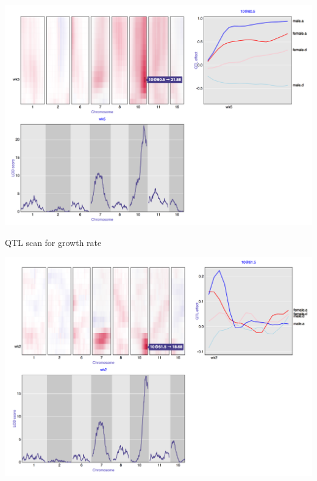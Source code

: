 \documentclass[12pt]{article}
\newcommand{\headsize}{\fontsize{35}{35} \selectfont}
\begin{document}
\centerline{\href{https://www.biostat.wisc.edu/~kbroman/presentations/CTC2014/iplot_bodyweight.html}{\includegraphics[height=0.9\textheight]{Figs/iplot_bodyweight.png}}}




\newpage

\headsize \color{myyellow}
\hfill \begin{minipage}{5.75in}
\centering
QTL scan for growth rate
\end{minipage}

\vspace{5mm}

\centerline{\href{https://www.biostat.wisc.edu/~kbroman/presentations/CTC2014/iplot_deriv_bodyweight.html}{\includegraphics[height=0.9\textheight]{Figs/iplot_deriv_bodyweight.png}}}
\end{document}
